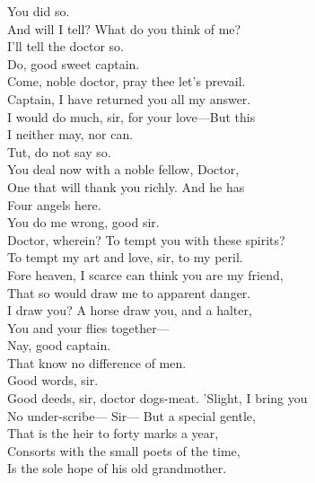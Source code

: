\documentclass[a4paper,oneside,12pt]{memoir}
\begin{document}
\begin{drama*}
\facespeaks {} You did so.\\
\dapperspeaks And will I tell? What do you think of me?\\
\facespeaks I'll tell the doctor so.\\
\dapperspeaks {} Do, good sweet captain.\\
\facespeaks Come, noble doctor, pray thee let's prevail.\\
\subtlespeaks Captain, I have returned you all my answer.\\
I would do much, sir, for your love---But this\\
I neither may, nor can.\\
\facespeaks {} Tut, do not say so.\\
You deal now with a noble fellow, Doctor,\\
One that will thank you richly. And he has\\
Four angels here.\\
\subtlespeaks {} You do me wrong, good sir.\\
\facespeaks Doctor, wherein? To tempt you with these spirits?\\
\subtlespeaks To tempt my art and love, sir, to my peril.\\
Fore heaven, I scarce can think you are my friend,\\
That so would draw me to apparent danger.\\
\facespeaks I draw you? A horse draw you, and a halter,\\
You and your flies together---\\
\dapperspeaks {} Nay, good captain.\\
\facespeaks That know no difference of men.\\
\subtlespeaks {} Good words, sir.\\
\facespeaks Good deeds, sir, doctor dogs-meat. 'Slight, I bring you\\
No under-scribe---
\dapperspeaks {} Sir---
\facespeaks {} But a special gentle,\\
That is the heir to forty marks a year,\\
Consorts with the small poets of the time,\\
Is the sole hope of his old grandmother.\\

\end{drama*}
\end{document}
